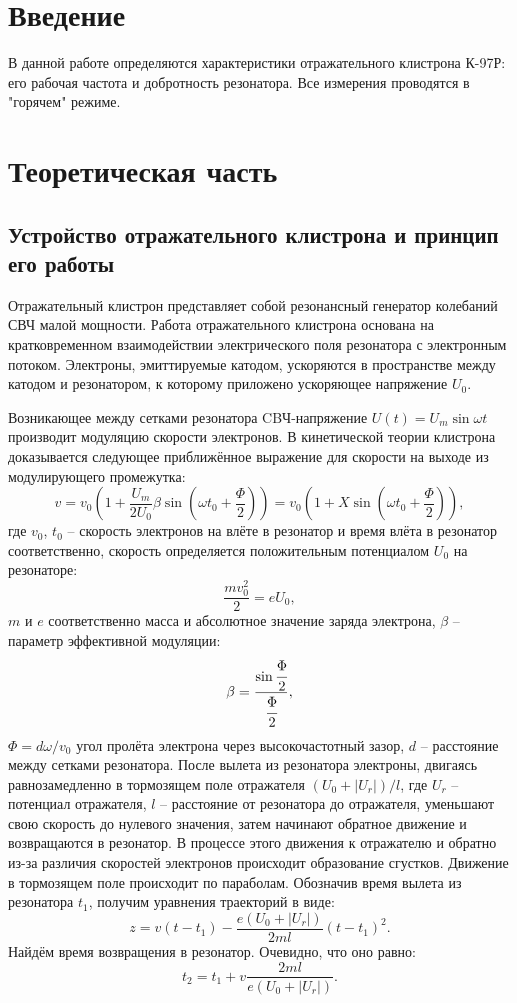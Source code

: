 \documentclass[a4paper]{article}
\begin{document}
	\section*{Введение}
	В данной работе определяются характеристики отражательного клистрона К-97Р: его рабочая частота и добротность резонатора. Все измерения проводятся в "горячем" режиме.
	
	\section{Теоретическая часть}
	\subsection{Устройство отражательного клистрона и принцип его работы}
	Отражательный клистрон представляет собой резонансный генератор колебаний СВЧ малой мощности.
	Работа отражательного клистрона основана на кратковременном взаимодействии электрического поля резонатора с электронным потоком. 
	Электроны,  эмиттируемые  катодом,  ускоряются  в  пространстве  между катодом и резонатором, к которому приложено ускоряющее напряжение $U_0$.
	
	Возникающее между сетками резонатора CBЧ-напряжение $U(t)=U_m \sin \omega t$ производит модуляцию скорости электронов. В кинетической
	теории клистрона доказывается следующее приближённое выражение для скорости на выходе из модулирующего промежутка:
	\begin{equation}
	v = v_0 \left(1 + \frac{U_m}{2U_0} \beta \sin \left(\omega t_0 + \frac{\Phi}{2}\right) \right) = v_0 \left(1 + X \sin \left(\omega t_0 + \frac{\Phi}{2}\right) \right) ,
	\end{equation}
	где $v_0$, $t_0$ -- скорость электронов на влёте в резонатор и время влёта в резонатор соответственно, скорость определяется положительным потенциалом $U_0$ на резонаторе:
	\[
	\frac{mv_0^2}{2} = e U_0,
	\]
	$m$ и $e$ соответственно масса и абсолютное значение заряда электрона, $\beta$ -- параметр эффективной модуляции:
	\[
	\beta = \frac{\sin \cfrac{\Phi}{2}}{\cfrac{\Phi}{2}},
	\]
	$\Phi = d\omega/v_0$ угол пролёта электрона через высокочастотный зазор, $d$ -- расстояние между сетками резонатора.
	После вылета из резонатора электроны, двигаясь равнозамедленно в тормозящем поле отражателя $(U_0 + |U_r|)/l$, где $U_r$ -- потенциал отражателя, $l$ -- расстояние от резонатора до отражателя, уменьшают свою скорость до нулевого значения, затем начинают обратное движение и возвращаются в резонатор. В процессе этого движения к отражателю и обратно из-за различия скоростей электронов происходит образование сгустков. Движение в тормозящем поле происходит по параболам. Обозначив время вылета из резонатора $t_1$, получим уравнения траекторий в виде:
	\begin{equation}
	z = v (t - t_1) - \frac{e(U_0 + |U_r|)}{2ml} (t - t_1)^2.
	\end{equation}
	Найдём время возвращения в резонатор. Очевидно, что оно равно:
	\begin{equation}
	t_2 = t_1 +  v \frac{2ml}{e(U_0 + |U_r|)}.
	\end{equation}
	
\end{document}
